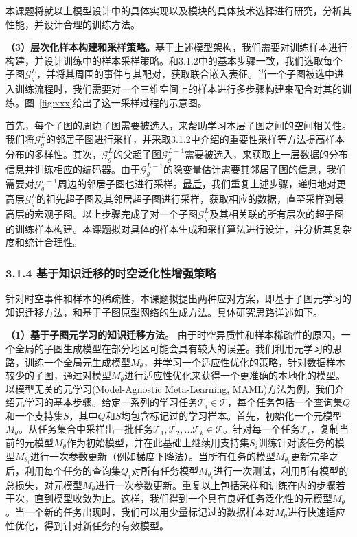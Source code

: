 \documentclass[12pt,UTF8,AutoFakeBold=2,a4paper]{ctexart} %
\begin{document}
本课题将就以上模型设计中的具体实现以及模块的具体技术选择进行研究，分析其性能，并设计合理的训练方法。

\textbf{（3）层次化样本构建和采样策略。}基于上述模型架构，我们需要对训练样本进行构建，并设计训练中的样本采样策略。和3.1.2中的基本步骤一致，我们选取每个子图$\mathcal{G}^{L}_g$，并将其周围的事件与其配对，获取联合嵌入表征。当一个子图被选中进入训练流程时，我们需要对一个三维空间上的样本进行多步骤构建来配合对其的训练。图~\ref{fig:xxx}给出了这一采样过程的示意图。

\underline{首先}，每个子图的周边子图需要被选入，来帮助学习本层子图之间的空间相关性。我们将$\mathcal{G}^{L}_g$的邻居子图进行采样，并采取3.1.2中介绍的重要性采样等方法提高样本分布的多样性。\underline{其次}，$\mathcal{G}^{L}_g$的父超子图$\mathcal{G}^{L-1}_g$需要被选入，来获取上一层数据的分布信息并训练相应的编码器。由于$\mathcal{G}^{L-1}_g$的隐变量估计需要其邻居子图的信息，我们需要对$\mathcal{G}^{L-1}_g$周边的邻居子图也进行采样。\underline{最后}，我们重复上述步骤，递归地对更高层$\mathcal{G}^{L}_g$的祖先超子图及其邻居超子图进行采样，获取相应的数据，直至采样到最高层的宏观子图。以上步骤完成了对一个子图$\mathcal{G}^{L}_g$及其相关联的所有层次的超子图的训练样本构建。本课题拟对具体的样本生成和采样算法进行设计，并分析其复杂度和统计合理性。

\subsubsection{3.1.4 基于知识迁移的时空泛化性增强策略}
针对时空事件和样本的稀疏性，本课题拟提出两种应对方案，即基于子图元学习的知识迁移方法，和基于子图原型网络的生成方法。具体研究思路详述如下。

\textbf{（1）基于子图元学习的知识迁移方法}。  
由于时空异质性和样本稀疏性的原因，一个全局的子图生成模型在部分地区可能会具有较大的误差。我们利用元学习的思路，训练一个全局元生成模型$M_\theta$，并学习一个适应性优化的策略，针对数据样本较少的子图，通过对模型$M_\theta$进行适应性优化来获得一个更准确的本地化的模型。以模型无关的元学习(Model-Agnostic Meta-Learning, MAML)方法为例，我们介绍元学习的基本步骤。给定一系列的学习任务$\mathcal{T}_i\in \mathcal{T}$，每个任务包括一个查询集$Q$和一个支持集$S$，其中$Q$和$S$均包含标记过的学习样本。首先，初始化一个元模型$M_\theta$。从任务集合中采样出一批任务$\mathcal{T}_1, \mathcal{T}_2, ... \mathcal{T}_k \in \mathcal{T}$。针对每一个任务$\mathcal{T}_i$，复制当前的元模型$M_\theta$作为初始模型，并在此基础上继续用支持集$S_i$训练针对该任务的模型$M_{\theta_i}$进行一次参数更新（例如梯度下降法）。当所有任务的模型$M_{\theta_i}$更新完毕之后，利用每个任务的查询集$Q_i$对所有任务模型$M_{\theta_i}$进行一次测试，利用所有模型的总损失，对元模型$M_\theta$进行一次参数更新。重复以上包括采样和训练在内的步骤若干次，直到模型收敛为止。这样，我们得到一个具有良好任务泛化性的元模型$M_\theta$。当一个新的任务出现时，我们可以用少量标记过的数据样本对$M_\theta$进行快速适应性优化，得到针对新任务的有效模型。
\end{document}
